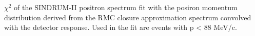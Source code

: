 \vspace{0.1in}
 {
  \label{fig:ana_step2_fit_kmax}
  $\chi^2$ of the SINDRUM-II positron spectrum fit with the posiron momentum distribution
  derived from the RMC closure approximation spectrum convolved with the detector response. 
  Used in the fit are events with p < 88 MeV/c.
}
\vspace{0.1in}


